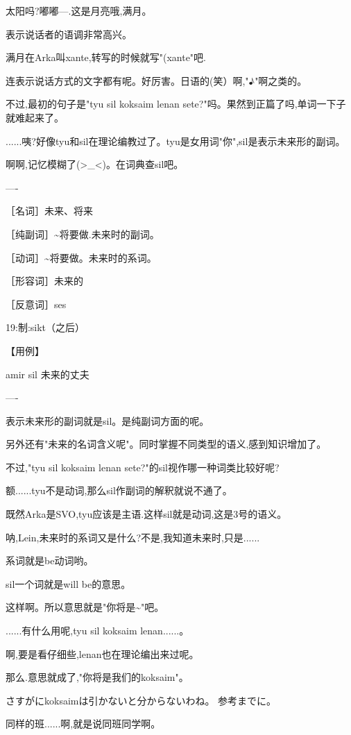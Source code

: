 太阳吗?嘟嘟---.这是月亮哦,满月。

表示说话者的语调非常高兴。

满月在Arka叫xante,转写的时候就写"(xante"吧.


连表示说话方式的文字都有呢。好厉害。日语的(笑）啊,"♪"啊之类的。

不过,最初的句子是"tyu sil koksaim lenan sete?"吗。果然到正篇了吗,单词一下子就难起来了。

......咦?好像tyu和sil在理论编教过了。tyu是女用词"你",sil是表示未来形的副词。

啊啊,记忆模糊了(>\_<)。在词典查sil吧。

----

［名词］未来、将来

［纯副词］\~{}将要做.未来时的副词。

［动词］\~{}将要做。未来时的系词。

［形容词］未来的

［反意词］ses

19:制:sikt（之后）

【用例】

amir sil 未来的丈夫


----

表示未来形的副词就是sil。是纯副词方面的呢。

另外还有"未来的名词含义呢"。同时掌握不同类型的语义,感到知识增加了。

不过,"tyu sil koksaim lenan sete?"的sil视作哪一种词类比较好呢?


额......tyu不是动词,那么sil作副词的解釈就说不通了。

既然Arka是SVO,tyu应该是主语.这样sil就是动词,这是3号的语义。

呐,Lein,未来时的系词又是什么?不是,我知道未来时,只是......


系词就是be动词哟。

sil一个词就是will be的意思。


这样啊。所以意思就是"你将是\~{}"吧。

......有什么用呢,tyu sil koksaim lenan......。

啊,要是看仔细些,lenan也在理论编出来过呢。%

那么.意思就成了,"你将是我们的koksaim"。


さすがにkoksaimは引かないと分からないわね。
参考までに。

同样的班......啊,就是说同班同学啊。

